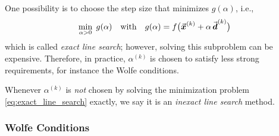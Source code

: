 One possibility is to choose the step size that minimizes \(g(\alpha)\), i.e.,
\begin{equation}
\label{eq:exact_line_search}
\min_{\alpha > 0} \; g(\alpha) \quad \text{with} \quad g(\alpha)=f\bigl(\vect{x}^{(k)} + \alpha\, \vect{d}^{(k)}\bigr) %
\end{equation}
which is called \emph{exact line search}; however, solving this subproblem can be expensive. Therefore, in practice, \(\alpha^{(k)}\) is chosen to satisfy less strong requirements, for instance the Wolfe conditions.

\begin{remark}
Whenever \(\alpha^{(k)}\) is \emph{not} chosen by solving the minimization problem \eqref{eq:exact_line_search} exactly, we say it is an \emph{inexact line search} method.
\end{remark}



\subsubsection{Wolfe Conditions}



